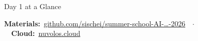 \documentclass[aspectratio=169,11pt]{beamer}
\begin{document}
\begin{frame}{Day 1 at a Glance}
\begin{center}
\end{center}

\vspace{0.1cm}
\begin{center}
{\footnotesize \textbf{Materials:}~\href{https://github.com/sischei/summer-school-AI-for-economics-and-finance-2026}{github.com/sischei/summer-school-AI-\ldots-2026}~~$\cdot$~~\textbf{Cloud:}~\href{https://nuvolos.cloud}{nuvolos.cloud}}
\end{center}
\end{frame}
\end{document}
